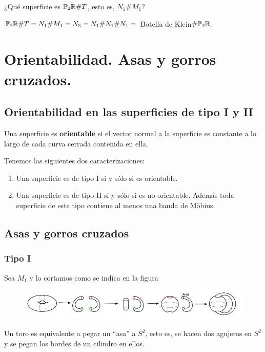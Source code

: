 \documentclass[GTSResumen.tex]{subfiles}
\begin{document}
\begin{ej}
¿Qué superficie es $\mathbb{P}_2\mathbb{R}\# T$, esto es, $N_1\# M_1$?

$\mathbb{P}_2\mathbb{R}\# T=N_1\# M_1=N_3=N_1\# N_1\# N_1=$ Botella de Klein$\#\mathbb{P}_2\mathbb{R}$.
\end{ej}

\section{Orientabilidad. Asas y gorros cruzados.}
\subsection{Orientabilidad en las superficies de tipo I y II}
\begin{defi} Una superficie es \textbf{orientable} si el vector normal a la superficie es constante a lo largo de cada curva cerrada contenida en ella.
\end{defi}
\begin{teorema} Tenemos las siguientes dos caracterizaciones:
\begin{enumerate}
\item Una superficie es de tipo I si y sólo si es orientable.
\item Una superficie es de tipo II si y sólo si es no orientable. Además toda superficie de este tipo contiene al menos una banda de Möbius.
\end{enumerate}

\end{teorema}

\subsection{Asas y gorros cruzados}
\subsubsection{Tipo I}
\begin{flushleft}
Sea $M_1$ y lo cortamos como se indica en la figura
\begin{figure}[h!]
	\includegraphics[scale=0.9]{asaink}
\end{figure}
Un toro es equivalente a pegar un ``asa'' a $S^2$, esto es, se hacen dos agujeros en $S^2$ y se pegan los bordes de un cilindro en ellos.
\end{flushleft}\
\end{document}
